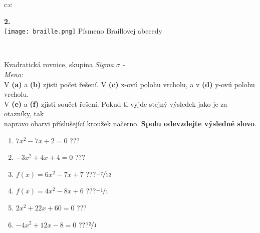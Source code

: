 \documentclass[10pt]{report}
\begin{document}
\begin{tabular}{c:c}
\begin{minipage}[c][99mm][t]{0.49\linewidth}
\begin{center}
\begin{minipage}{0.20\linewidth}
\begin{center}
{\Huge\bfseries 2.} \\[2mm]
\texttt{[image: braille.png]}
{\small Písmeno Braillovej abecedy}
\end{center}
\end{minipage}
\end{center}
\end{minipage}
\\ \hdashline
\begin{minipage}[c][99mm][t]{0.49\linewidth}
\begin{center}
\vspace{7mm}
{\huge Kvadratická rovnice, skupina \textit{Sigma $\sigma$} -}\\[4.5mm]
\textit{Meno:}\phantom{xxxxxxxxxxxxxxxxxxxxxxxxxxxxxxxxxxxxxxxxxxxxxxxxxxxxxxxxxxxxxxxxx}\\[3.5mm]
V \textbf{(a)} a \textbf{(b)} zjisti počet řešení. V \textbf{(c)} x-ovú polohu vrcholu, a v \textbf{(d)} y-ovú polohu vrcholu.\\V \textbf{(e)} a \textbf{(f)} zjisti součet řešení. Pokud ti vyjde stejný výsledek jako je za otazníky, tak\\napravo obarvi příslušející kroužek načerno. \textbf{Spolu odevzdejte výsledné slovo}.\\[3mm]
\begin{minipage}{0.77\linewidth}
\begin{center}
\begin{varwidth}{\textwidth}
\begin{enumerate}
\large
\item $7x^2-7x+2=0$\quad \dotfill\; ???\;\dotfill {}
\item $-3x^2+4x+4=0$\quad \dotfill\; ???\;\dotfill {}
\item $f(x)=6x^2-7x+7$\quad \dotfill\; ???\;\dotfill \quad $\nicefrac{-7}{12}$
\item $f(x)=4x^2-8x+6$\quad \dotfill\; ???\;\dotfill \quad $\nicefrac{-1}{1}$
\item $2x^2+22x+60=0$\quad \dotfill\; ???\;\dotfill {}
\item $-4x^2+12x-8=0$\quad \dotfill\; ???\;\dotfill \quad $\nicefrac{3}{1}$
\end{enumerate}
\end{varwidth}
\end{center}
\end{minipage}
\begin{minipage}{0.20\linewidth}
\begin{center}

\end{center}
\end{minipage}
\end{center}
\end{minipage}
\end{tabular}
\end{document}
